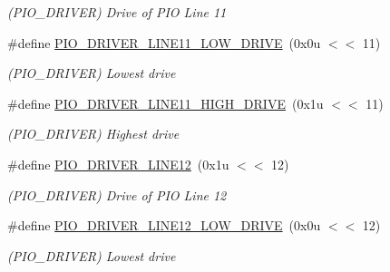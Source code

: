 \begin{DoxyCompactItemize}
\begin{DoxyCompactList}\small\item\em (P\+I\+O\+\_\+\+D\+R\+I\+V\+ER) Drive of P\+IO Line 11 \end{DoxyCompactList}\item 
\mbox{\label{group__SAMS70__PIO_ga36c4f41409bea340a44b854cc93f6329}} 
\#define \mbox{\hyperlink{group__SAMS70__PIO_ga36c4f41409bea340a44b854cc93f6329}{P\+I\+O\+\_\+\+D\+R\+I\+V\+E\+R\+\_\+\+L\+I\+N\+E11\+\_\+\+L\+O\+W\+\_\+\+D\+R\+I\+VE}}~(0x0u $<$$<$ 11)
\begin{DoxyCompactList}\small\item\em (P\+I\+O\+\_\+\+D\+R\+I\+V\+ER) Lowest drive \end{DoxyCompactList}\item 
\mbox{\label{group__SAMS70__PIO_gae68e39271c5bc9b708370363b6d3cc95}} 
\#define \mbox{\hyperlink{group__SAMS70__PIO_gae68e39271c5bc9b708370363b6d3cc95}{P\+I\+O\+\_\+\+D\+R\+I\+V\+E\+R\+\_\+\+L\+I\+N\+E11\+\_\+\+H\+I\+G\+H\+\_\+\+D\+R\+I\+VE}}~(0x1u $<$$<$ 11)
\begin{DoxyCompactList}\small\item\em (P\+I\+O\+\_\+\+D\+R\+I\+V\+ER) Highest drive \end{DoxyCompactList}\item 
\mbox{\label{group__SAMS70__PIO_ga642d9d0ecb5d5714014a793518fe14fd}} 
\#define \mbox{\hyperlink{group__SAMS70__PIO_ga642d9d0ecb5d5714014a793518fe14fd}{P\+I\+O\+\_\+\+D\+R\+I\+V\+E\+R\+\_\+\+L\+I\+N\+E12}}~(0x1u $<$$<$ 12)
\begin{DoxyCompactList}\small\item\em (P\+I\+O\+\_\+\+D\+R\+I\+V\+ER) Drive of P\+IO Line 12 \end{DoxyCompactList}\item 
\mbox{\label{group__SAMS70__PIO_gab11cbc9448ce0cedeba18546d346dc7f}} 
\#define \mbox{\hyperlink{group__SAMS70__PIO_gab11cbc9448ce0cedeba18546d346dc7f}{P\+I\+O\+\_\+\+D\+R\+I\+V\+E\+R\+\_\+\+L\+I\+N\+E12\+\_\+\+L\+O\+W\+\_\+\+D\+R\+I\+VE}}~(0x0u $<$$<$ 12)
\begin{DoxyCompactList}\small\item\em (P\+I\+O\+\_\+\+D\+R\+I\+V\+ER) Lowest drive \end{DoxyCompactList}\item 

\end{DoxyCompactItemize}

